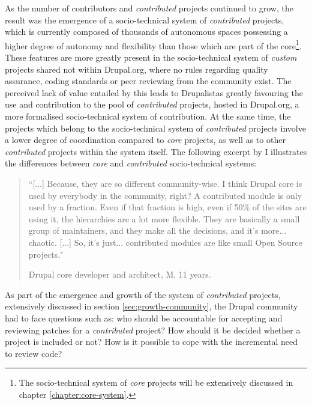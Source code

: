 As the number of contributors and \textit{contributed} projects continued to grow, the result was the emergence of a socio-technical system of \textit{contributed} projects, which is currently composed of thousands of autonomous spaces possessing a higher degree of autonomy and flexibility than those which are part of the core\footnote{The socio-technical system of \textit{core} projects will be extensively discussed in chapter \ref{chapter:core-system}.}. These features are more greatly present in the socio-technical system of \textit{custom} projects shared not within Drupal.org, where no rules regarding quality assurance, coding standards or peer reviewing from the community exist. The perceived lack of value entailed by this leads to Drupalistas greatly favouring the use and contribution to the pool of \textit{contributed} projects, hosted in Drupal.org, a more formalised socio-technical system of contribution. At the same time, the projects which belong to the socio-technical system of \textit{contributed} projects involve a lower degree of coordination compared to \textit{core} projects, as well as to other \textit{contributed} projects within the system itself. The following excerpt by  I illustrates the differences between \textit{core} and \textit{contributed} socio-technical systems:

\begin{quotation}
``[...] Because, they are so different community-wise. I think Drupal core is used by everybody in the community, right? A contributed module is only used by a fraction. Even if that fraction is high, even if 50\% of the sites are using it, the hierarchies are a lot more flexible. They are basically a small group of maintainers, and they make all the decisions, and it's more... chaotic. [...] So, it's just... contributed modules are like small Open Source projects."

\begin{flushright}\footnotesize{Drupal core developer and architect, M, 11 years.}\end{flushright}
\end{quotation}

As part of the emergence and growth of the system of \textit{contributed} projects, extensively discussed in section \ref{sec:growth-community}, the Drupal community had to face questions such as: who should be accountable for accepting and reviewing patches for a \textit{contributed} project? How should it be decided whether a project is included or not? How is it possible to cope with the incremental need to review code?


